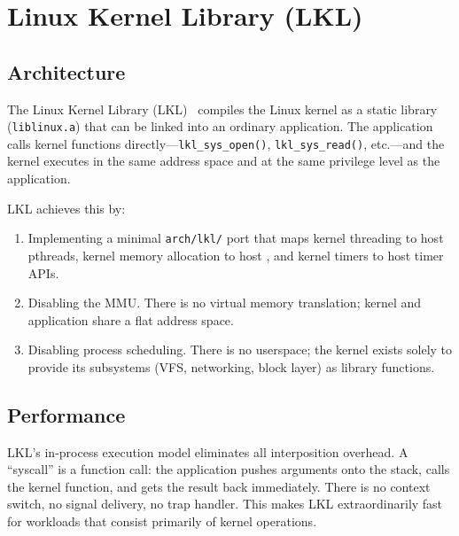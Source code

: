 \section{Linux Kernel Library (LKL)}
\label{sec:related-lkl}

\subsection{Architecture}

The Linux Kernel Library (\textsc{LKL})~\cite{purdila2010,lkl}
compiles the Linux kernel as a static library (\texttt{liblinux.a})
that can be linked into an ordinary application.  The application
calls kernel functions directly---\texttt{lkl\_sys\_open()},
\texttt{lkl\_sys\_read()}, etc.---and the kernel executes in the
same address space and at the same privilege level as the application.

\textsc{LKL} achieves this by:

\begin{enumerate}[leftmargin=2em]
  \item Implementing a minimal \texttt{arch/lkl/} port that maps
        kernel threading to host pthreads, kernel memory allocation
        to host , and kernel timers to host timer
        APIs.
  \item Disabling the MMU.  There is no virtual memory translation;
        kernel and application share a flat address space.
  \item Disabling process scheduling.  There is no userspace; the
        kernel exists solely to provide its subsystems (VFS, networking,
        block layer) as library functions.
\end{enumerate}

\subsection{Performance}

\textsc{LKL}'s in-process execution model eliminates all
interposition overhead.  A ``syscall'' is a function call: the
application pushes arguments onto the stack, calls the kernel
function, and gets the result back immediately.  There is no context
switch, no signal delivery, no trap handler.  This makes \textsc{LKL}
extraordinarily fast for workloads that consist primarily of kernel
operations.

